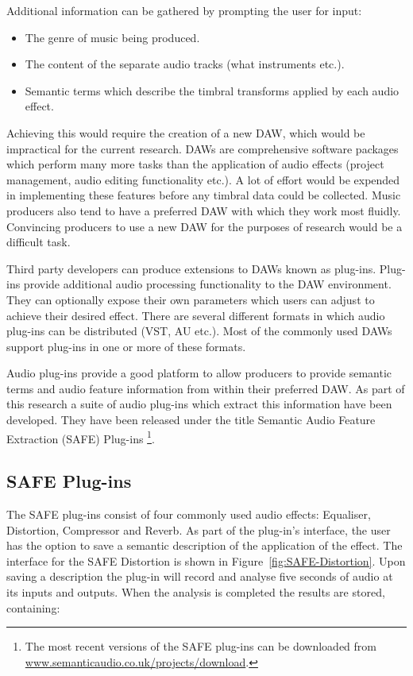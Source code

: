 		Additional information can be gathered by prompting the user for input:

		\begin{itemize}
			\item The genre of music being produced.
			\item The content of the separate audio tracks (what instruments etc.).
			\item Semantic terms which describe the timbral transforms applied by each audio
			      effect.
		\end{itemize}

		Achieving this would require the creation of a new DAW, which would be impractical for the current
		research. DAWs are comprehensive software packages which perform many more tasks than the application of
		audio effects (project management, audio editing functionality etc.). A lot of effort would be expended in
		implementing these features before any timbral data could be collected. Music producers also tend to have a
		preferred DAW with which they work most fluidly. Convincing producers to use a new DAW for the purposes of
		research would be a difficult task.

		Third party developers can produce extensions to DAWs known as plug-ins. Plug-ins provide additional audio
		processing functionality to the DAW environment. They can optionally expose their own parameters which
		users can adjust to achieve their desired effect. There are several different formats in which audio
		plug-ins can be distributed (VST, AU etc.). Most of the commonly used DAWs support plug-ins in one or more
		of these formats.

		Audio plug-ins provide a good platform to allow producers to provide semantic terms and audio feature
		information from within their preferred DAW. As part of this research a suite of audio plug-ins which
		extract this information have been developed. They have been released under the title Semantic Audio
		Feature Extraction (SAFE) Plug-ins \footnote{The most recent versions of the SAFE plug-ins can be
		downloaded from \href{http://www.semanticaudio.co.uk/projects/download/}
		{www.semanticaudio.co.uk/projects/download}.}.

	\subsection{SAFE Plug-ins}
	\label{sec:TimbreEvaluation-DAWBasedTimbreEvaluation-SAFE}
		The SAFE plug-ins consist of four commonly used audio effects: Equaliser, Distortion, Compressor and
		Reverb. As part of the plug-in's interface, the user has the option to save a semantic description of the
		application of the effect. The interface for the SAFE Distortion is shown in
		Figure~\ref{fig:SAFE-Distortion}. Upon saving a description the plug-in will record and analyse five
		seconds of audio at its inputs and outputs. When the analysis is completed the results are stored,
		containing:

